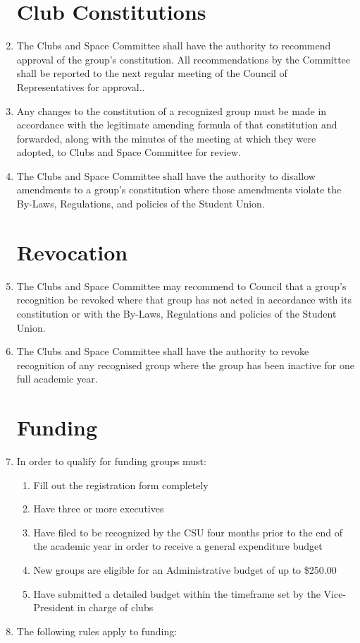 \documentclass[oneside]{book}
\begin{document}
\begin{enumerate}
\section{\label{Club_Constitutions}Club Constitutions }
\item The Clubs and Space Committee shall have the authority to recommend
approval of the group's constitution. All recommendations by the Committee
shall be reported to the next regular meeting of the Council of Representatives
for approval.. 
\item Any changes to the constitution of a recognized group must be made
in accordance with the legitimate amending formula of that constitution
and forwarded, along with the minutes of the meeting at which they
were adopted, to Clubs and Space Committee for review. 
\item The Clubs and Space Committee shall have the authority to disallow
amendments to a group's constitution where those amendments violate
the By-Laws, Regulations, and policies of the Student Union. 

\section{\label{Revocation}Revocation }
\item The Clubs and Space Committee may recommend to Council that a group's
recognition be revoked where that group has not acted in accordance
with its constitution or with the By-Laws, Regulations and policies
of the Student Union. 
\item The Clubs and Space Committee shall have the authority to revoke recognition
of any recognised group where the group has been inactive for one
full academic year. 

\section{\label{Funding}Funding }
\item In order to qualify for funding groups must: 

\begin{enumerate}
\item Fill out the registration form completely 
\item Have three or more executives 
\item Have filed to be recognized by the CSU four months prior to the end
of the academic year in order to receive a general expenditure budget 
\item New groups are eligible for an Administrative budget of up to \$250.00 
\item Have submitted a detailed budget within the timeframe set by the Vice-President
in charge of clubs 
\end{enumerate}
\item The following rules apply to funding:


\end{enumerate}
\end{document}
